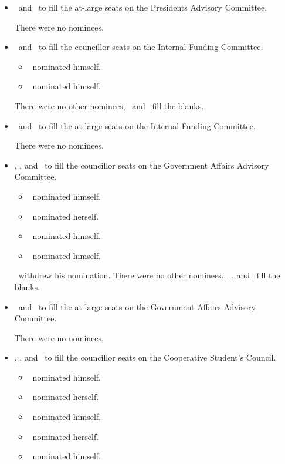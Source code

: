 \documentclass[12pt, letterpaper]{article}
\begin{document}
\begin{motion}
\begin{itemize}
        \item \blank\ and \blank\ to fill the at-large seats on the 
            Presidents Advisory Committee.

            There were no nominees.

        \item \blank\ and \blank\ to fill the councillor seats on the 
            Internal Funding Committee.
            \begin{itemize}
                \item \ben\ nominated himself.
                \item \tomson\ nominated himself.
            \end{itemize}

            There were no other nominees, \ben\ and \tomson\ fill the 
            blanks. 

        \item \blank\ and \blank\ to fill the at-large seats on the 
            Internal Funding Committee.

            There were no nominees.

        \item \blank, \blank, and \blank\ to fill the councillor seats on the 
            Government Affairs Advisory Committee.
            \begin{itemize}
                \item \jason\ nominated himself.
                \item \stephanie\ nominated herself.
                \item \subham\ nominated himself.
                \item \ben\ nominated himself.
            \end{itemize}

            \subham\ withdrew his nomination. There were no other nominees,
            \jason, \stephanie, and \ben\ fill the blanks. 

        \item \blank\ and \blank\ to fill the at-large seats on the 
            Government Affairs Advisory Committee.

            There were no nominees.

        \item \blank, \blank, and \blank\ to fill the councillor seats on the 
            Cooperative Student's Council.
            \begin{itemize}
                \item \subham\ nominated himself.
                \item \rebecca\ nominated herself.
                \item \seneca\ nominated himself.
                \item \elizabeth\ nominated herself.
                \item \jason\ nominated himself.
            \end{itemize}


\end{itemize}
\end{motion}
\end{document}
